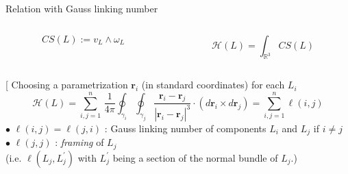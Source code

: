 \documentclass[beamer,10pt]{standalone}
\begin{document}
\begin{frame}{Relation with Gauss linking number}\label{frame:msknots2}
		\vspace{-2.5ex}
  	\begin{columns}
		\begin{column}[t]{.5\linewidth}	
			\begin{defblock}
				$$
					CS({L}) :=  v_{L} \wedge  \omega_{ L} 
				$$
			\end{defblock}
		\end{column}
		\begin{column}[t]{.5\linewidth}	
			\begin{defblock}[Helicity]
				$$
 					{\mathcal H}(L) = \int_{\mathbb{R}^3} CS({L})
				$$
			\end{defblock}						
		\end{column}
  	\end{columns}
	\pause
	\begin{propblock}[
		Choosing a parametrization $\mathbf{r}_i$ (in standard coordinates) for each $L_i$ 
		\begin{displaymath}
			{\mathcal H}(L)  = 
			\sum_{i,j=1}^n
			\,\frac{1}{4\pi}
			\oint_{\gamma_i}\oint_{\gamma_j}
			\frac{\mathbf{r}_i - \mathbf{r}_j}{|\mathbf{r}_i - \mathbf{r}_j|^3}
			\cdot (d\mathbf{r}_i \times d\mathbf{r}_j) =
			\sum_{i,j=1}^n \ell(i,j)
		\end{displaymath}
			$\bullet$ $\ell(i,j) = \ell(j,i)$ : Gauss linking number of components $L_i$ and $L_j$ if $i\neq j$\\
			$\bullet$ $\ell(j,j)$ : {\it framing} of $L_j$\\ 
			\phantom{-------}\footnotesize{ (i.e. $\ell(L_j, L_j^{\prime})$ with $L_j^{\prime}$ being a section of the normal bundle of $L_j$.)}\normalsize


\end{propblock}
\end{frame}
\end{document}
